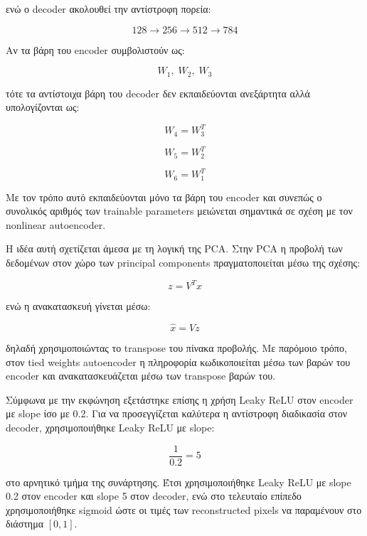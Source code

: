 \documentclass[12pt]{article}
\begin{document}
ενώ ο decoder ακολουθεί την αντίστροφη πορεία:

\begin{equation}
128 \rightarrow 256 \rightarrow 512 \rightarrow 784
\end{equation}

Αν τα βάρη του encoder συμβολιστούν ως:

\[
W_1,\;W_2,\;W_3
\]

τότε τα αντίστοιχα βάρη του decoder δεν εκπαιδεύονται ανεξάρτητα αλλά υπολογίζονται ως:

\begin{equation}
W_4=W_3^T
\end{equation}

\begin{equation}
W_5=W_2^T
\end{equation}

\begin{equation}
W_6=W_1^T
\end{equation}

Με τον τρόπο αυτό εκπαιδεύονται μόνο τα βάρη του encoder και συνεπώς ο συνολικός αριθμός των trainable parameters μειώνεται σημαντικά σε σχέση με 
τον nonlinear autoencoder.

Η ιδέα αυτή σχετίζεται άμεσα με τη λογική της PCA. Στην PCA η προβολή των δεδομένων στον χώρο των principal components πραγματοποιείται 
μέσω της σχέσης:

\begin{equation}
z = V^T x
\end{equation}

ενώ η ανακατασκευή γίνεται μέσω:

\begin{equation}
\hat{x}=Vz
\end{equation}

δηλαδή χρησιμοποιώντας το transpose του πίνακα προβολής. Με παρόμοιο τρόπο, στον tied weights autoencoder η πληροφορία κωδικοποιείται μέσω των 
βαρών του encoder και ανακατασκευάζεται μέσω των transpose βαρών του.

Σύμφωνα με την εκφώνηση εξετάστηκε επίσης η χρήση Leaky ReLU στον encoder με slope ίσο με 0.2. Για να προσεγγίζεται καλύτερα η αντίστροφη 
διαδικασία στον decoder, χρησιμοποιήθηκε Leaky ReLU με slope:

\begin{equation}
\frac{1}{0.2}=5
\end{equation}

στο αρνητικό τμήμα της συνάρτησης. Έτσι χρησιμοποιήθηκε Leaky ReLU με slope 0.2 στον encoder και slope 5 στον decoder, ενώ στο τελευταίο επίπεδο 
χρησιμοποιήθηκε sigmoid ώστε οι τιμές των reconstructed pixels να παραμένουν στο διάστημα $[0,1]$.
\end{document}
